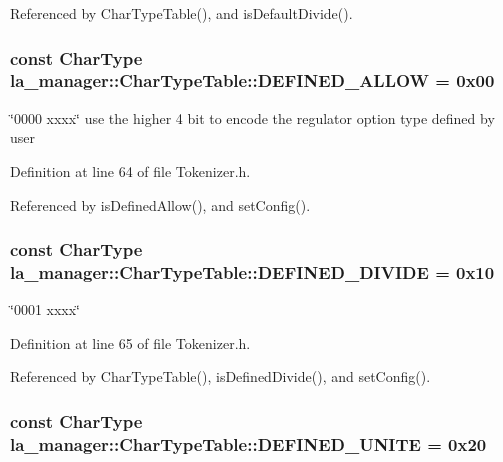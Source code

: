 Referenced by CharTypeTable(), and isDefaultDivide().\hypertarget{classla__manager_1_1CharTypeTable_24cd292ce579aec3623576c01f825711}{
\subsubsection[{DEFINED\_\-ALLOW}]{\setlength{\rightskip}{0pt plus 5cm}const {\bf CharType} {\bf la\_\-manager::CharTypeTable::DEFINED\_\-ALLOW} = 0x00}}
\label{classla__manager_1_1CharTypeTable_24cd292ce579aec3623576c01f825711}


\char`\"{}0000 xxxx\char`\"{} use the higher 4 bit to encode the regulator option type defined by user 



Definition at line 64 of file Tokenizer.h.

Referenced by isDefinedAllow(), and setConfig().\hypertarget{classla__manager_1_1CharTypeTable_0f2478ccc6c68f09e814030b82bf0b3e}{
\subsubsection[{DEFINED\_\-DIVIDE}]{\setlength{\rightskip}{0pt plus 5cm}const {\bf CharType} {\bf la\_\-manager::CharTypeTable::DEFINED\_\-DIVIDE} = 0x10}}
\label{classla__manager_1_1CharTypeTable_0f2478ccc6c68f09e814030b82bf0b3e}


\char`\"{}0001 xxxx\char`\"{} 



Definition at line 65 of file Tokenizer.h.

Referenced by CharTypeTable(), isDefinedDivide(), and setConfig().\hypertarget{classla__manager_1_1CharTypeTable_7c1779063e32cc836decb19a51ada7bb}{
\subsubsection[{DEFINED\_\-UNITE}]{\setlength{\rightskip}{0pt plus 5cm}const {\bf CharType} {\bf la\_\-manager::CharTypeTable::DEFINED\_\-UNITE} = 0x20}}
\label{classla__manager_1_1CharTypeTable_7c1779063e32cc836decb19a51ada7bb}


